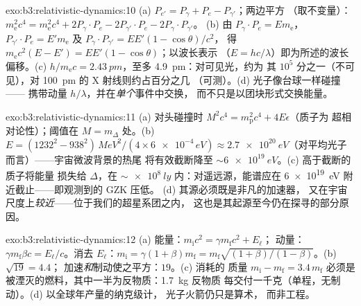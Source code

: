 \begin{solution}{exo:b3:relativistic-dynamics:10}
(a) $P_{e'} = P_\gamma + P_e - P_{\gamma'}$；两边平方
（取不变量）：$m_{\text{e}}^2c^4 = m_{\text{e}}^2c^4 + 2P_\gamma\!
\cdot\!P_e - 2P_{\gamma'}\!\cdot\!P_e - 2P_\gamma\!\cdot\!P_{\gamma'}$。
(b) 由 $P_\gamma\!\cdot\!P_e = E m_{\text{e}}$，
$P_{\gamma'}\!\cdot\!P_e = E'm_{\text{e}}$ 及 $P_\gamma\!\cdot\!
P_{\gamma'} = EE'(1 - \cos\theta)/c^2$，
得 $m_{\text{e}}c^2(E - E') = EE'(1 - \cos\theta)$；以波长表示
（$E = hc/\lambda$）即为所述的波长偏移。(c) $h/m_{\text{e}}c =
\qty{2.43}{pm}$，至多 \qty{4.9}{pm}：对可见光，约为
其 $10^5$ 分之一（不可见），对 \qty{100}{pm} 的 X 射线则约占百分之几
（可测）。(d) 光子像台球一样碰撞——
携带动量 $h/\lambda$，并在\emph{单个}事件中交换，
而不只是以团块形式交换能量。
\end{solution}

\begin{solution}{exo:b3:relativistic-dynamics:11}
(a) 对头碰撞时 $M^2c^4 = m_{\text{p}}^2c^4 + 4E\epsilon$（质子为
超相对论性）；阈值在 $M = m_\Delta$ 处。(b) $E =
(1232^2 - 938^2)\,\unit{MeV^2}/(4 \times \num{6e-4}\,\unit{eV})
\approx \qty{2.7e20}{eV}$（对平均光子而言）——宇宙微波背景的热尾
将有效截断降至
$\sim\qty{6e19}{eV}$。(c) 高于截断的质子将能量
损失给 $\Delta$，在 $\sim\qty{e8}{ly}$ 内：对遥远源，能谱应在
\qty{6e19}{eV} 附近截止——即观测到的 GZK 压低。
(d) 其源必须既是非凡的加速器，
又在宇宙尺度上\emph{较近}——位于我们的超星系团之内，
这也是其起源至今仍在探寻的部分原因。
\end{solution}

\begin{solution}{exo:b3:relativistic-dynamics:12}
(a) 能量：$m_{\text{i}}c^2 = \gamma m_{\text{f}}c^2 + E_\ell$；
动量：$\gamma m_{\text{f}}\beta c = E_\ell/c$。消去
$E_\ell$：$m_{\text{i}} = \gamma(1 + \beta)m_{\text{f}} =
m_{\text{f}}\sqrt{(1+\beta)/(1-\beta)}$。(b) $\sqrt{19} = 4.4$；
加速\emph{和}制动使之平方：$19$。(c) 消耗的
质量 $m_{\text{i}} - m_{\text{f}} = 3.4\,m_{\text{f}}$ 必须是
被湮灭的燃料，其中一半为反物质：\qty{1.7}{kg} 反物质
每交付一千克（单程，无制动）。(d) 以全球年产量的纳克级计，
光子火箭仍只是算术，
而非工程。
\end{solution}

